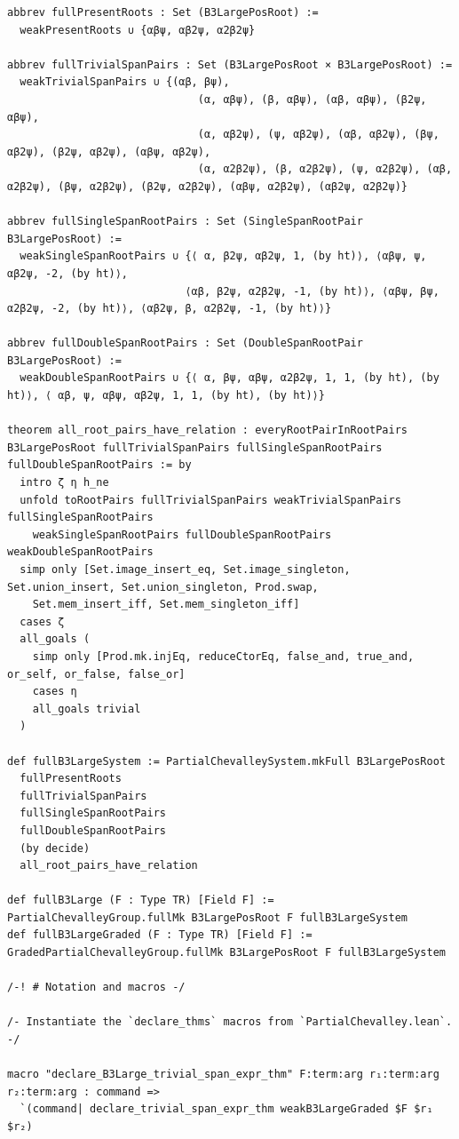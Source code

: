 \begin{Verbatim}
abbrev fullPresentRoots : Set (B3LargePosRoot) :=
  weakPresentRoots ∪ {αβψ, αβ2ψ, α2β2ψ}

abbrev fullTrivialSpanPairs : Set (B3LargePosRoot × B3LargePosRoot) :=
  weakTrivialSpanPairs ∪ {(αβ, βψ),
                              (α, αβψ), (β, αβψ), (αβ, αβψ), (β2ψ, αβψ),
                              (α, αβ2ψ), (ψ, αβ2ψ), (αβ, αβ2ψ), (βψ, αβ2ψ), (β2ψ, αβ2ψ), (αβψ, αβ2ψ),
                              (α, α2β2ψ), (β, α2β2ψ), (ψ, α2β2ψ), (αβ, α2β2ψ), (βψ, α2β2ψ), (β2ψ, α2β2ψ), (αβψ, α2β2ψ), (αβ2ψ, α2β2ψ)}

abbrev fullSingleSpanRootPairs : Set (SingleSpanRootPair B3LargePosRoot) :=
  weakSingleSpanRootPairs ∪ {⟨ α, β2ψ, αβ2ψ, 1, (by ht)⟩, ⟨αβψ, ψ, αβ2ψ, -2, (by ht)⟩,
                            ⟨αβ, β2ψ, α2β2ψ, -1, (by ht)⟩, ⟨αβψ, βψ, α2β2ψ, -2, (by ht)⟩, ⟨αβ2ψ, β, α2β2ψ, -1, (by ht)⟩}

abbrev fullDoubleSpanRootPairs : Set (DoubleSpanRootPair B3LargePosRoot) :=
  weakDoubleSpanRootPairs ∪ {⟨ α, βψ, αβψ, α2β2ψ, 1, 1, (by ht), (by ht)⟩, ⟨ αβ, ψ, αβψ, αβ2ψ, 1, 1, (by ht), (by ht)⟩}

theorem all_root_pairs_have_relation : everyRootPairInRootPairs B3LargePosRoot fullTrivialSpanPairs fullSingleSpanRootPairs fullDoubleSpanRootPairs := by
  intro ζ η h_ne
  unfold toRootPairs fullTrivialSpanPairs weakTrivialSpanPairs fullSingleSpanRootPairs
    weakSingleSpanRootPairs fullDoubleSpanRootPairs weakDoubleSpanRootPairs
  simp only [Set.image_insert_eq, Set.image_singleton, Set.union_insert, Set.union_singleton, Prod.swap,
    Set.mem_insert_iff, Set.mem_singleton_iff]
  cases ζ
  all_goals (
    simp only [Prod.mk.injEq, reduceCtorEq, false_and, true_and, or_self, or_false, false_or]
    cases η
    all_goals trivial
  )

def fullB3LargeSystem := PartialChevalleySystem.mkFull B3LargePosRoot
  fullPresentRoots
  fullTrivialSpanPairs
  fullSingleSpanRootPairs
  fullDoubleSpanRootPairs
  (by decide)
  all_root_pairs_have_relation

def fullB3Large (F : Type TR) [Field F] := PartialChevalleyGroup.fullMk B3LargePosRoot F fullB3LargeSystem
def fullB3LargeGraded (F : Type TR) [Field F] := GradedPartialChevalleyGroup.fullMk B3LargePosRoot F fullB3LargeSystem

/-! # Notation and macros -/

/- Instantiate the `declare_thms` macros from `PartialChevalley.lean`. -/

macro "declare_B3Large_trivial_span_expr_thm" F:term:arg r₁:term:arg r₂:term:arg : command =>
  `(command| declare_trivial_span_expr_thm weakB3LargeGraded $F $r₁ $r₂)


\end{Verbatim}
